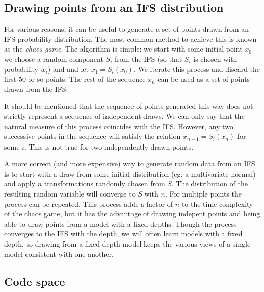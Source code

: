 \documentclass[10pt,a4paper,oneside]{article}
\theoremstyle{definition}
\begin{document}
\subsection*{Drawing points from an IFS distribution}

For various reasons, it can be useful to generate a set of points drawn from an IFS probability distribution. The most common method to achieve this is known as the \emph{chaos game}. The algorithm is simple: we start with some initial point $x_0$ we choose a random component $S_i$ from the IFS (so that $S_i$ is chosen with probability $w_i$) and and let $x_1 = S_i(x_0)$. We iterate this process and discard the first 50 or so points. The rest of the sequence $x_n$ can be used as a set of points drawn from the IFS.

It should be mentioned that the sequence of points generated this way does not strictly represent a sequence of independent draws. We can only say that the natural measure of this process coincides with the IFS. However, any two successive points in the sequence will satisfy the relation $x_{n+1} = S_i(x_{n})$ for some $i$. This is not true for two independently drawn points. 

A more correct (and more expensive) way to generate random data from an IFS is to start with a draw from some initial distribution (eg. a multivariate normal) and apply $n$ transformations randomly chosen from $S$. The distribution of the resulting random variable will converge to $S$ with $n$. For multiple points the process can be repeated. This process adds a factor of $n$ to the time complexity of the chaos game, but it has the advantage of drawing indepent points and being able to draw points from a model with a fixed depths. Though the process converges to the IFS with the depth, we will often learn models with a fixed depth, so drawing from a fixed-depth model keeps the various views of a single model consistent with one another. 

\subsection*{Code space}
\label{sec:code-space}
\end{document}
